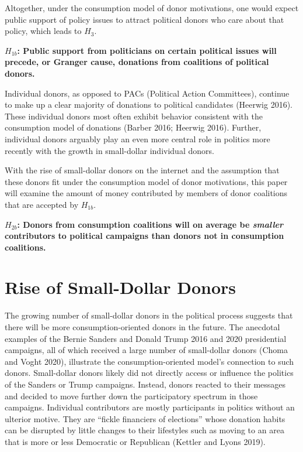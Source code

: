 \documentclass[12pt,]{article}
\begin{document}
Altogether, under the consumption model of donor motivations, one would
expect public support of policy issues to attract political donors who
care about that policy, which leads to \(H_{3}\).

\textbf{\(H_{1b}\): Public support from politicians on certain political
issues will precede, or Granger cause, donations from coalitions of
political donors.}

Individual donors, as opposed to PACs (Political Action Committees),
continue to make up a clear majority of donations to political
candidates (Heerwig 2016). These individual donors most often exhibit
behavior consistent with the consumption model of donations (Barber
2016; Heerwig 2016). Further, individual donors arguably play an even
more central role in politics more recently with the growth in
small-dollar individual donors.

With the rise of small-dollar donors on the internet and the assumption
that these donors fit under the consumption model of donor motivations,
this paper will examine the amount of money contributed by members of
donor coalitions that are accepted by \(H_{1b}\).

\textbf{\(H_{2b}\): Donors from consumption coalitions will on average
be \emph{smaller} contributors to political campaigns than donors not in
consumption coalitions.}

\hypertarget{rise-of-small-dollar-donors}{%
\section{Rise of Small-Dollar
Donors}\label{rise-of-small-dollar-donors}}

The growing number of small-dollar donors in the political process
suggests that there will be more consumption-oriented donors in the
future. The anecdotal examples of the Bernie Sanders and Donald Trump
2016 and 2020 presidential campaigns, all of which received a large
number of small-dollar donors (Choma and Voght 2020), illustrate the
consumption-oriented model's connection to such donors. Small-dollar
donors likely did not directly access or influence the politics of the
Sanders or Trump campaigns. Instead, donors reacted to their messages
and decided to move further down the participatory spectrum in those
campaigns. Individual contributors are mostly participants in politics
without an ulterior motive. They are ``fickle financiers of elections''
whose donation habits can be disrupted by little changes to their
lifestyles such as moving to an area that is more or less Democratic or
Republican (Kettler and Lyons 2019).
\end{document}
